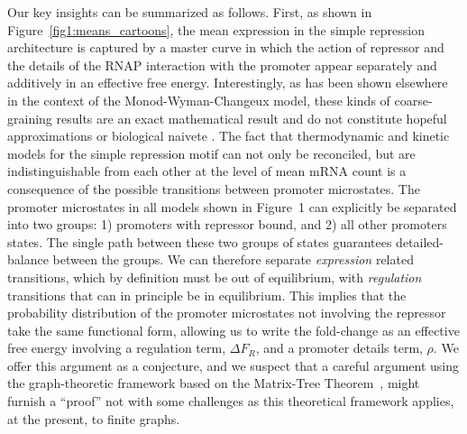 Our key insights can be summarized as follows. First, as shown in
Figure~\ref{fig1:means_cartoons}, the mean expression in the simple repression
architecture is captured by a master curve in which the action of repressor and
the details of the RNAP interaction with the promoter appear separately and
additively in an effective free energy. Interestingly, as has been shown
elsewhere in the context of the Monod-Wyman-Changeux model, these kinds of
coarse-graining results are an exact mathematical result and do not constitute
hopeful approximations or biological naivete \cite{Razo-Mejia2018, Chure2019}.
The fact that thermodynamic and kinetic models for the simple repression motif
can not only be reconciled, but are indistinguishable from each other at the
level of mean mRNA count is a consequence of the possible transitions between
promoter microstates. The promoter microstates in all models shown in Figure~1
can explicitly be separated into two groups: 1) promoters with repressor bound,
and 2) all other promoters states. The single path between these two groups of
states guarantees detailed-balance between the groups. We can therefore separate
\textit{expression} related transitions, which by definition must be out of
equilibrium, with \textit{regulation} transitions that can in principle be in
equilibrium. This implies that the probability distribution of the promoter
microstates not involving the repressor take the same functional form, allowing
us to write the fold-change as an effective free energy involving a regulation
term, $\Delta F_R$, and a promoter details term, $\rho$. We offer this argument
as a conjecture, and we suspect that a careful argument using the
graph-theoretic framework based on the Matrix-Tree
Theorem~\cite{Gunawardena2012}, might furnish a ``proof'' not with some
challenges as this theoretical framework applies, at the present, to finite
graphs.

